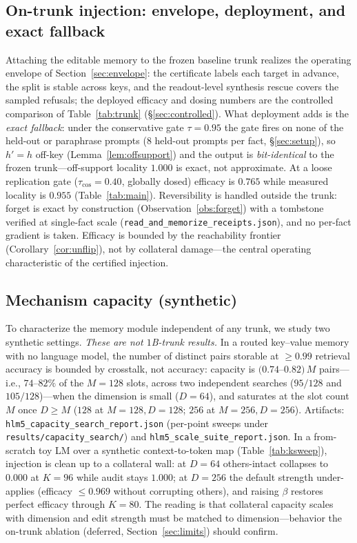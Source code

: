 \documentclass[11pt]{article}
\theoremstyle{remark}
\begin{document}
\subsection{On-trunk injection: envelope, deployment, and exact fallback}
\label{sec:spread}

Attaching the editable memory to the frozen baseline trunk realizes the
operating envelope of Section~\ref{sec:envelope}: the certificate labels each
target in advance, the split is stable across keys, and the readout-level
synthesis rescue covers the sampled refusals; the deployed efficacy and dosing
numbers are the controlled comparison of Table~\ref{tab:trunk}
(\S\ref{sec:controlled}). What deployment adds is the \emph{exact fallback}:
under the conservative gate $\tau=0.95$ the gate fires on none of the held-out
or paraphrase prompts ($8$ held-out prompts per fact, \S\ref{sec:setup}), so
$h'=h$ off-key (Lemma~\ref{lem:offsupport}) and the output is
\emph{bit-identical} to the frozen trunk---off-support locality $1.000$ is
exact, not approximate. At a loose replication gate ($\tau_{\cos}=0.40$,
globally dosed) efficacy is $0.765$ while measured locality is $0.955$
(Table~\ref{tab:main}). Reversibility is handled outside the trunk: forget is
exact by construction (Observation~\ref{obs:forget}) with a tombstone verified
at single-fact scale (\texttt{read\_and\_memorize\_receipts.json}), and no
per-fact gradient is taken. Efficacy is bounded by the reachability frontier
(Corollary~\ref{cor:unflip}), not by collateral damage---the central operating
characteristic of the certified injection.

\subsection{Mechanism capacity (synthetic)}
\label{sec:capacity}

To characterize the memory module independent of any trunk, we study two synthetic
settings. \emph{These are not $1$B-trunk results.} In a routed key--value memory
with no language model, the number of distinct pairs storable at $\ge 0.99$
retrieval accuracy is bounded by crosstalk, not accuracy: capacity is
$(0.74$--$0.82)\,M$ pairs---i.e., $74$--$82\%$ of the $M{=}128$ slots, across two
independent searches ($95/128$ and $105/128$)---when the dimension is small
($D{=}64$), and
saturates at the slot count $M$ once $D\ge M$ ($128$ at $M{=}128,D{=}128$; $256$ at
$M{=}256,D{=}256$). Artifacts: \texttt{hlm5\_capacity\_search\_report.json}
(per-point sweeps under \texttt{results/capacity\_search/}) and
\texttt{hlm5\_scale\_suite\_report.json}. In a from-scratch toy LM over a synthetic context-to-token map
(Table~\ref{tab:ksweep}), injection is clean up to a collateral wall: at $D{=}64$
others-intact collapses to $0.000$ at $K{=}96$ while audit stays $1.000$; at
$D{=}256$ the default strength under-applies (efficacy $\le 0.969$ without
corrupting others), and raising $\beta$ restores perfect efficacy through $K{=}80$.
The reading is that collateral capacity scales with dimension and edit strength
must be matched to dimension---behavior the on-trunk ablation (deferred,
Section~\ref{sec:limits}) should confirm.
\end{document}
